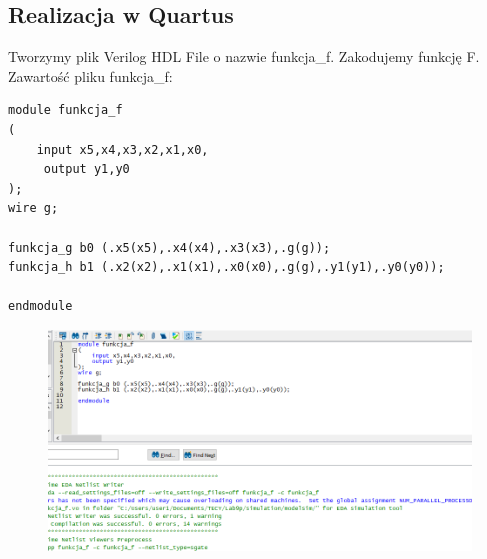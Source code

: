 \documentclass[]{article}
\begin{document}
\subsection{Realizacja w Quartus}
Tworzymy plik Verilog HDL File o nazwie funkcja\_f. Zakodujemy funkcję F. 
\newline
Zawartość pliku funkcja\_f:
\begin{lstlisting}[style={prettyverilog}]
module funkcja_f
(   
    input x5,x4,x3,x2,x1,x0,
	 output y1,y0
);	 
wire g;
 
funkcja_g b0 (.x5(x5),.x4(x4),.x3(x3),.g(g));
funkcja_h b1 (.x2(x2),.x1(x1),.x0(x0),.g(g),.y1(y1),.y0(y0));
 
endmodule
\end{lstlisting}
\begin{figure}[H]
	\centering
	\includegraphics[width=1.39\textwidth]{1.15.png}
\end{figure}
\end{document}
